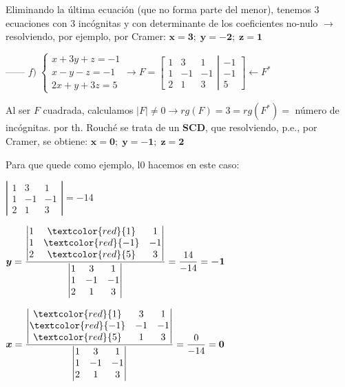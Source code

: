 \begin{proofw}
Eliminando la última ecuación (que no forma parte del menor), tenemos 3 ecuaciones con 3 incógnitas y con determinante de los coeficientes no-nulo $\to $ resolviendo, por ejemplo, por Cramer: $\boldsymbol{x=3; \; y=-2;\; z=1}$


------ $f)\; \begin{cases}   x+3y+z=-1\\x-y-z=-1\\2x+y+3z=5\end{cases} \to F=\left[ \begin{matrix}  1&3&1\\1&-1&-1\\2&1&3 
\end{matrix} \right| \left. \begin{matrix} 
 	-1\\-1\\5
 \end{matrix} \right] \leftarrow F^*$
 
 Al ser $F$ cuadrada, calculamos $|F|\neq 0 \to rg(F)=3=rg(F^*)= $ número de incógnitas. por th. Rouché se trata de un \textbf{SCD}, que resolviendo, p.e., por Cramer, se obtiene: $\boldsymbol{x=0; \; y=-1; \; z=2}$
 
 Para que quede como ejemplo, l0 hacemos en este caso:

\begin{multicols}{2} 
\noindent \footnotesize{$\left| \begin{matrix}  1&3&1\\1&-1&-1\\2&1&3 
\end{matrix} \right|=-14$}

\noindent \footnotesize{$\boldsymbol{y}= \dfrac {\left| \begin{matrix}  1&\textcolor{red}{1}&1\\1&\textcolor{red}{-1}&-1\\2&\textcolor{red}{5}&3 
\end{matrix} \right|}{\left| \begin{matrix}  1&3&1\\1&-1&-1\\2&1&3 
\end{matrix} \right|}=\dfrac {14} {-14}=\boldsymbol{-1}$}

\noindent \footnotesize{$\boldsymbol{x}= \dfrac {\left| \begin{matrix}  \textcolor{red}{1}&3&1\\\textcolor{red}{-1}&-1&-1\\\textcolor{red}{5}&1&3 
\end{matrix} \right|}{\left| \begin{matrix}  1&3&1\\1&-1&-1\\2&1&3 
\end{matrix} \right|}=\dfrac {0} {-14}=\boldsymbol{0}$}



\end{multicols}
\end{proofw}
